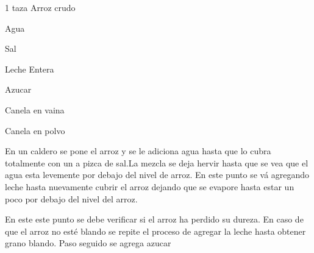 


\begin{ingredientes}
\item 1 taza Arroz crudo
\item Agua
\item Sal
\item Leche Entera
\item Azucar
\item Canela en vaina
\item Canela en polvo
\end{ingredientes}
\preparacion

En un caldero se pone el arroz y se le adiciona agua hasta que lo cubra totalmente con un a pizca de sal.La mezcla se deja hervir hasta que se vea que el agua esta levemente por debajo del nivel de arroz. En este punto se vá agregando leche hasta nuevamente cubrir el arroz dejando que se evapore hasta estar un poco por debajo del nivel del arroz. 

En este este punto se debe verificar si el arroz ha perdido su dureza. En caso de que el arroz no esté blando se repite el proceso de agregar la leche hasta obtener grano blando. Paso seguido se agrega azucar